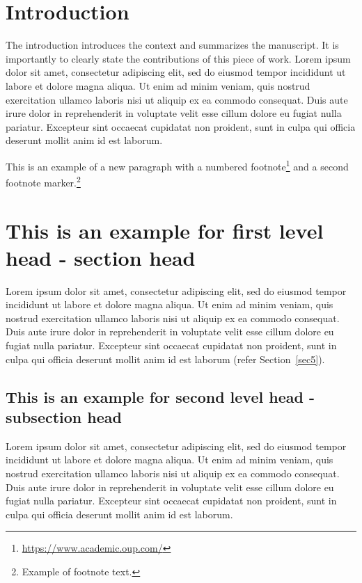 \documentclass[unnumsec,webpdf,modern,large]{oup-authoring-template}%
\theoremstyle{thmstyleone}%
\theoremstyle{thmstyletwo}%
\theoremstyle{thmstylethree}%
\begin{document}

\section{Introduction}
The introduction introduces the context and summarizes the manuscript. It is importantly to clearly state the contributions
of this piece of work. Lorem ipsum dolor sit amet, consectetur adipiscing elit, sed do eiusmod tempor incididunt ut labore et dolore magna aliqua. Ut enim ad minim veniam, quis nostrud exercitation ullamco laboris nisi ut aliquip ex ea commodo consequat. Duis aute irure dolor in reprehenderit in voluptate velit esse cillum dolore eu fugiat nulla pariatur. Excepteur sint occaecat cupidatat non proident, sunt in culpa qui officia deserunt mollit anim id est laborum.

This is an example of a new paragraph with a numbered footnote\footnote{\url{https://www.academic.oup.com/}} and a second footnote marker.\footnote{Example of footnote text.}



\section{This is an example for first level head - section head}\label{sec2}

Lorem ipsum dolor sit amet, consectetur adipiscing elit, sed do eiusmod tempor incididunt ut labore et dolore magna aliqua. Ut enim ad minim veniam, quis nostrud exercitation ullamco laboris nisi ut aliquip ex ea commodo consequat. Duis aute irure dolor in reprehenderit in voluptate velit esse cillum dolore eu fugiat nulla pariatur. Excepteur sint occaecat cupidatat non proident, sunt in culpa qui officia deserunt mollit anim id est laborum (refer Section~\ref{sec5}).

\subsection{This is an example for second level head - subsection head}\label{subsec1}

Lorem ipsum dolor sit amet, consectetur adipiscing elit, sed do eiusmod tempor incididunt ut labore et dolore magna aliqua. Ut enim ad minim veniam, quis nostrud exercitation ullamco laboris nisi ut aliquip ex ea commodo consequat. Duis aute irure dolor in reprehenderit in voluptate velit esse cillum dolore eu fugiat nulla pariatur. Excepteur sint occaecat cupidatat non proident, sunt in culpa qui officia deserunt mollit anim id est laborum.
\end{document}
